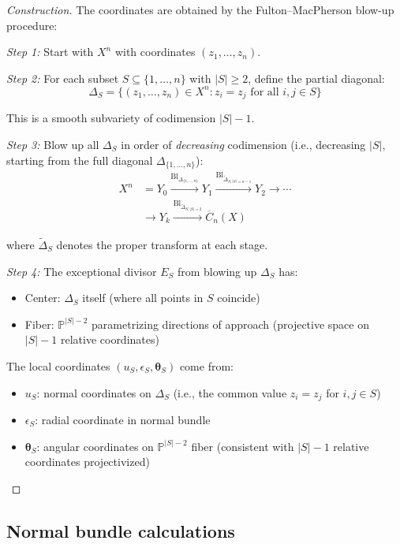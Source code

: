 \begin{proof}[Construction]
The coordinates are obtained by the Fulton--MacPherson blow-up procedure:

\emph{Step 1:} Start with $X^n$ with coordinates $(z_1, \ldots, z_n)$.

\emph{Step 2:} For each subset $S \subseteq \{1,\ldots,n\}$ with $|S| \geq 2$, define
the partial diagonal:
\[\Delta_S = \{(z_1,\ldots,z_n) \in X^n : z_i = z_j \text{ for all } i,j \in S\}\]

This is a smooth subvariety of codimension $|S|-1$.

\emph{Step 3:} Blow up all $\Delta_S$ in order of \emph{decreasing} codimension
(i.e., decreasing $|S|$, starting from the full diagonal $\Delta_{\{1,\ldots,n\}}$):
\begin{align*}
X^n &= Y_0 \xrightarrow{\text{Bl}_{\Delta_{\{1,\ldots,n\}}}} Y_1 
\xrightarrow{\text{Bl}_{\widetilde{\Delta}_{S, |S|=n-1}}} Y_2 \to \cdots\\
&\to Y_k \xrightarrow{\text{Bl}_{\widetilde{\Delta}_{S, |S|=2}}} \overline{C}_n(X)
\end{align*}

where $\widetilde{\Delta}_S$ denotes the proper transform at each stage.

\emph{Step 4:} The exceptional divisor $E_S$ from blowing up $\Delta_S$ has:
\begin{itemize}
\item Center: $\Delta_S$ itself (where all points in $S$ coincide)
\item Fiber: $\mathbb{P}^{|S|-2}$ parametrizing directions of approach (projective space on $|S|-1$ relative coordinates)
\end{itemize}

The local coordinates $(u_S, \epsilon_S, \boldsymbol{\theta}_S)$ come from:
\begin{itemize}
\item $u_S$: normal coordinates on $\Delta_S$ (i.e., the common value $z_i = z_j$ for $i,j \in S$)
\item $\epsilon_S$: radial coordinate in normal bundle
\item $\boldsymbol{\theta}_S$: angular coordinates on $\mathbb{P}^{|S|-2}$ fiber (consistent with $|S|-1$ relative coordinates projectivized)
\end{itemize}
\end{proof}

\subsection{Normal bundle calculations}

